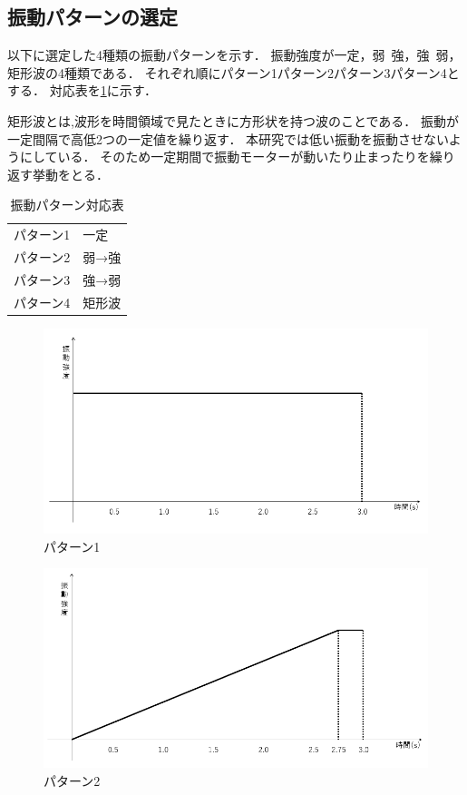 \newpage
\subsection{振動パターンの選定}
以下に選定した4種類の振動パターンを示す．
振動強度が一定，弱~強，強~弱，矩形波の4種類である．
それぞれ順にパターン1パターン2パターン3パターン4とする．
対応表を\ref{tab;sindou}に示す．

矩形波とは,波形を時間領域で見たときに方形状を持つ波のことである．
振動が一定間隔で高低2つの一定値を繰り返す．
本研究では低い振動を振動させないようにしている．
そのため一定期間で振動モーターが動いたり止まったりを繰り返す挙動をとる．

\begin{table}[H]
    \caption{振動パターン対応表}
    \centering
    \begin{tabular}{l|l}
    \hline
    \hline
    パターン1 & 一定 \\
    パターン2 & 弱→強 \\
    パターン3 & 強→弱 \\
    パターン4 & 矩形波 \\
    \hline
    \end{tabular}
    \label{tab;sindou}
\end{table}


\begin{figure}[h]
\centering
\includegraphics[clip,width=14cm]{./fig/patarn1.png}
\caption{パターン1}\label{patarn1}
\end{figure}

\begin{figure}[h]
\centering
\includegraphics[clip,width=14cm]{./fig/patarn2.png}
\caption{パターン2}\label{patarn2}
\end{figure}

